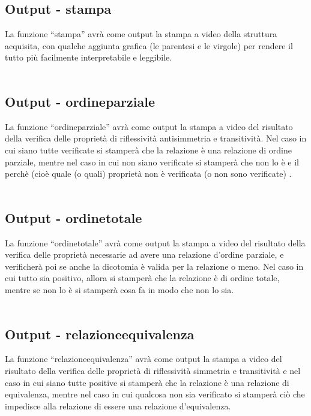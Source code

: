 \documentclass[11pt, a4paper, titlepage, block]{article}
\begin{document}
	\subsection{Output - stampa}
	La funzione “stampa” avr\`a come output la stampa a video della struttura acquisita, con qualche aggiunta grafica (le parentesi e le virgole) per rendere il tutto pi\`u facilmente interpretabile e leggibile.\\
	\\
	\subsection{Output - ordine\textunderscore parziale}
	La funzione “ordine\textunderscore parziale” avr\`a come output la stampa a video del risultato della verifica delle propriet\`a di riflessivit\`a antisimmetria e transitivit\`a. Nel caso in cui siano tutte verificate si stamper\`a che la relazione \`e una relazione di ordine parziale, mentre nel caso in cui non siano verificate si stamper\`a che non lo \`e e il perch\`e (cio\`e quale (o quali) propriet\`a non \`e verificata (o non sono verificate) .\\
	\\
	\subsection{Output - ordine\textunderscore totale}
	La funzione “ordine\textunderscore totale” avr\`a come output la stampa a video del risultato della verifica delle propriet\`a necessarie ad avere una relazione d'ordine parziale, e verificher\`a poi se anche la dicotomia \`e valida per la relazione o meno. Nel caso in cui tutto sia positivo, allora si stamper\`a che la relazione \`e di ordine totale, mentre se non lo \`e si stamper\`a cosa fa in modo che non lo sia.\\
	\\
	\subsection{Output - relazione\textunderscore equivalenza}
	La funzione “relazione\textunderscore equivalenza” avr\`a come output la stampa a video del risultato della verifica delle propriet\`a di riflessivit\`a simmetria e transitivit\`a e nel caso in cui siano tutte positive si stamper\`a che la relazione \`e una relazione di equivalenza, mentre nel caso in cui qualcosa non sia verificato si stamper\`a ci\`o che impedisce alla relazione di essere una relazione d'equivalenza.\\
	\\
\end{document}

